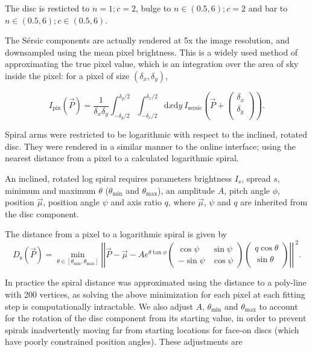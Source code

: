 \documentclass[trackchanges]{aastex63}
\begin{document}
The disc is resticted to $n=1; c=2$, bulge to $n\in(0.5, 6); c=2$ and bar to $n\in(0.5, 6); c\in(0.5, 6)$.

The S\'ersic components are actually rendered at 5x the image resolution, and downsampled using the mean pixel brightness. This is a widely used method of approximating the true pixel value, which is an integration over the area of sky inside the pixel: for a pixel of size $(\delta_x, \delta_y)$,

\begin{equation}
I_\mathrm{pix}(\vec{P}) = \frac{1}{\delta_x \delta_y}\int_{-\delta_y/2}^{\delta_y/2}\int_{-\delta_x/2}^{\delta_x/2}\mathrm{d}x\mathrm{d}y\ I_\mathrm{sersic}\left(\vec{P} + \begin{pmatrix}
\delta_x \\
\delta_y \\
\end{pmatrix}\right).
\end{equation}

Spiral arms were restricted to be logarithmic with respect to the inclined, rotated disc. They were rendered in a similar manner to the online interface; using the nearest distance from a pixel to a calculated logarithmic spiral.

An inclined, rotated log spiral requires parameters brightness $I_s$, spread $s$, minimum and maximum $\theta$ ($\theta_\mathrm{min}$ and $\theta_\mathrm{max}$), an amplitude $A$, pitch angle $\phi$, position $\vec\mu$, position angle $\psi$ and axis ratio $q$, where $\vec\mu$, $\psi$ and $q$ are inherited from the disc component.

The distance from a pixel to a logarithmic spiral is given by
\begin{equation}
  D_\mathrm{s}(\vec{P}) = \min_{\theta\in[\theta_\mathrm{min}, \theta_\mathrm{max}]}\left|\left|\vec{P} - \vec\mu - Ae^{\theta\tan\phi}\begin{pmatrix}
       \cos\psi & \sin\psi\\
       -\sin\psi & \cos\psi
       \end{pmatrix}
       \begin{pmatrix}
       q\cos\theta \\
       \sin\theta \\
       \end{pmatrix}
       \right|\right|^{\ 2}.
\end{equation}

In practice the spiral distance was approximated using the distance to a poly-line with 200 vertices, as solving the above minimization for each pixel at each fitting step is computationally intractable. We also adjust $A$, $\theta_\mathrm{min}$ and $\theta_\mathrm{max}$ to account for the rotation of the disc component from its starting value, in order to prevent spirals inadvertently moving far from starting locations for face-on discs (which have poorly constrained position angles). These adjustments are
\end{document}
